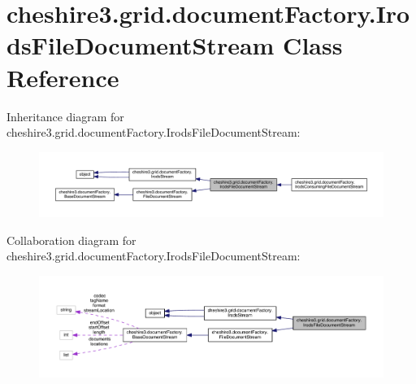 \hypertarget{classcheshire3_1_1grid_1_1document_factory_1_1_irods_file_document_stream}{\section{cheshire3.\-grid.\-document\-Factory.\-Irods\-File\-Document\-Stream Class Reference}
\label{classcheshire3_1_1grid_1_1document_factory_1_1_irods_file_document_stream}
}


Inheritance diagram for cheshire3.\-grid.\-document\-Factory.\-Irods\-File\-Document\-Stream\-:
\nopagebreak
\begin{figure}[H]
\begin{center}
\leavevmode
\includegraphics[width=350pt]{classcheshire3_1_1grid_1_1document_factory_1_1_irods_file_document_stream__inherit__graph}
\end{center}
\end{figure}


Collaboration diagram for cheshire3.\-grid.\-document\-Factory.\-Irods\-File\-Document\-Stream\-:
\nopagebreak
\begin{figure}[H]
\begin{center}
\leavevmode
\includegraphics[width=350pt]{classcheshire3_1_1grid_1_1document_factory_1_1_irods_file_document_stream__coll__graph}
\end{center}
\end{figure}
